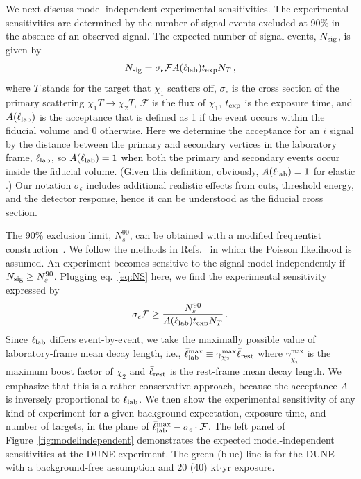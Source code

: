 We next discuss model-independent experimental sensitivities. 
The experimental sensitivities are determined by the number of signal events excluded at 90\%  in the absence of an observed signal.
The expected number of signal events, $N_{\rm sig}$, is given by
\begin{align}
N_{\rm sig} = \sigma_\epsilon \mathcal F A(\ell_{\rm lab}) t_{\rm exp} N_T\,,
\label{eq:NS}
\end{align}
where $T$ stands for the target that $\chi_1$ scatters off, $\sigma_\epsilon$ is the cross section of the primary scattering $\chi_1 T \to \chi_2 T$, $\mathcal F$ is the flux of $\chi_1$, $t_{\rm exp}$ is the exposure time, and $A(\ell_{\rm lab})$ is the acceptance that is defined as 1 if the event occurs within the fiducial volume and 0 otherwise.
Here we determine the acceptance for an $i$ signal by the distance between the primary and secondary vertices in the laboratory frame, $\ell_{\rm lab}$, so $A(\ell_{\rm lab}) = 1$ when both the primary and secondary events occur inside the fiducial volume. (Given this definition, obviously, $A(\ell_{\rm lab}) = 1$ for elastic .)
Our notation $\sigma_\epsilon$ includes additional realistic effects from cuts, threshold energy, and the detector response, hence it can be understood as the fiducial cross section.

The 90\%  exclusion limit, $N_s^{90}$, can be obtained with a modified frequentist construction~\cite{cls1,cls2}. We follow the methods in Refs.~\cite{Dermisek:2013cxa,Dermisek:2014qca,Dermisek:2016via} in which the Poisson likelihood is assumed. 
An experiment becomes sensitive to the signal model independently if $N_{\rm sig} \ge N_s^{90}$.
Plugging eq.~\eqref{eq:NS} here, we find the experimental sensitivity expressed by %
\begin{align}
\sigma_\epsilon \mathcal F \ge \frac{N_s^{90}}{A(\ell_{\rm lab}) t_{\rm exp} N_T}\,. 
\label{eq:MIsensitivity}
\end{align}
Since $\ell_{\rm lab}$ differs event-by-event, we take the maximally possible value of laboratory-frame mean decay length, i.e., $\bar{\ell}_{\rm lab}^{\rm max} \equiv \gamma_{\chi_2}^{\max} \bar{\ell}_{\rm rest}$ where $\gamma_{\chi_2}^{\max}$ is the maximum boost factor of $\chi_2$ and $\bar{\ell}_{\rm rest}$ is the rest-frame mean decay length. 
We emphasize that this is a rather conservative approach, because the acceptance $A$ is inversely proportional to $\ell_{\rm lab}$.
We then show the experimental sensitivity of any kind of experiment for a given background expectation, exposure time, and number of targets, in the plane of $\bar{\ell}_{\rm lab}^{\rm max} - \sigma_\epsilon \cdot \mathcal F$. 
The left panel of Figure~\ref{fig:modelindependent} demonstrates the expected model-independent sensitivities at the DUNE experiment.
The green (blue) line is for the DUNE  with a background-free assumption and 20 (40) kt$\cdot$yr exposure.

